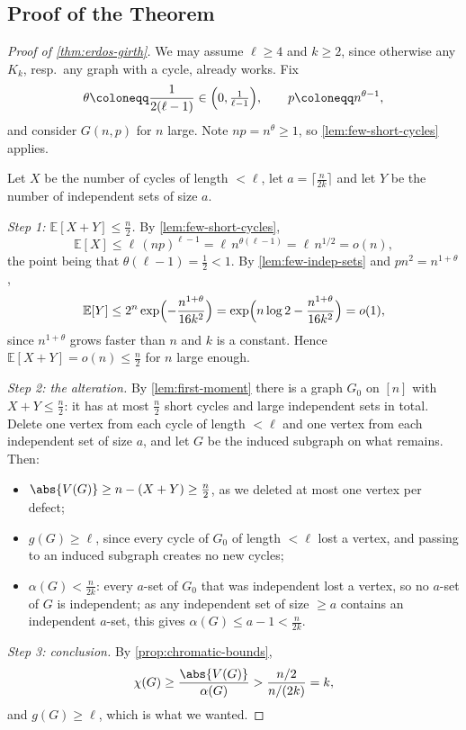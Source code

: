 \subsection{Proof of the Theorem}

\begin{proof}[Proof of \autoref{thm:erdos-girth}]
    We may assume \(\ell \ge 4\) and \(k \ge 2\), since otherwise any \(K_k\), resp.\ any graph with a cycle, already works. Fix
    \[
        \theta \coloneqq \frac{1}{2(\ell-1)} \in \Bigl( 0, \tfrac{1}{\ell-1} \Bigr),
        \qquad p \coloneqq n^{\theta - 1},
    \]
    and consider \(G(n,p)\) for \(n\) large. Note \(np = n^{\theta} \ge 1\), so \autoref{lem:few-short-cycles} applies.

    Let \(X\) be the number of cycles of length \(< \ell\), let \(a = \bigl\lceil \frac{n}{2k} \bigr\rceil\) and let \(Y\) be the number of independent sets of size \(a\).

    \emph{Step 1: \(\mathbb{E}[X + Y] \le \frac{n}{2}\).} By \autoref{lem:few-short-cycles},
    \[
        \mathbb{E}[X] \le \ell \, (np)^{\ell-1} = \ell \, n^{\theta(\ell-1)} = \ell \, n^{1/2} = o(n),
    \]
    the point being that \(\theta(\ell-1) = \frac{1}{2} < 1\). By \autoref{lem:few-indep-sets} and \(p n^{2} = n^{1 + \theta}\),
    \[
        \mathbb{E}[Y] \le 2^{n} \exp\Bigl( - \frac{n^{1+\theta}}{16k^{2}} \Bigr)
        = \exp\Bigl( n \log 2 - \frac{n^{1+\theta}}{16k^{2}} \Bigr) = o(1),
    \]
    since \(n^{1+\theta}\) grows faster than \(n\) and \(k\) is a constant. Hence \(\mathbb{E}[X+Y] = o(n) \le \frac{n}{2}\) for \(n\) large enough.

    \emph{Step 2: the alteration.} By \autoref{lem:first-moment} there is a graph \(G_0\) on \([n]\) with \(X + Y \le \frac{n}{2}\): it has at most \(\frac{n}{2}\) short cycles and large independent sets in total. Delete one vertex from each cycle of length \(< \ell\) and one vertex from each independent set of size \(a\), and let \(G\) be the induced subgraph on what remains. Then:
    \begin{itemize}
        \item \(\abs{V(G)} \ge n - (X + Y) \ge \frac{n}{2}\), as we deleted at most one vertex per defect;
        \item \(g(G) \ge \ell\), since every cycle of \(G_0\) of length \(< \ell\) lost a vertex, and passing to an induced subgraph creates no new cycles;
        \item \(\alpha(G) < \frac{n}{2k}\): every \(a\)-set of \(G_0\) that was independent lost a vertex, so no \(a\)-set of \(G\) is independent; as any independent set of size \(\ge a\) contains an independent \(a\)-set, this gives \(\alpha(G) \le a - 1 < \frac{n}{2k}\).
    \end{itemize}

    \emph{Step 3: conclusion.} By \autoref{prop:chromatic-bounds},
    \[
        \chi(G) \ge \frac{\abs{V(G)}}{\alpha(G)} > \frac{n/2}{n/(2k)} = k,
    \]
    and \(g(G) \ge \ell\), which is what we wanted.
\end{proof}

